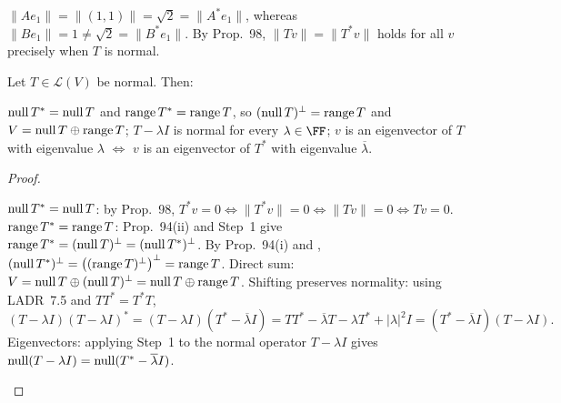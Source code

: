 \documentclass[10pt]{scrartcl}
\newcommand{\LL}{\mathcal L}\newcommand{\PP}{\mathcal P}\newcommand{\MM}{\mathcal M}
\begin{document}
\begin{fig}
\end{fig}

\revisit $\|Ae_1\|=\|(1,1)\|=\sqrt{2}=\|A^*e_1\|$, whereas $\|Be_1\|=1\neq \sqrt{2}=\|B^*e_1\|$. By Prop.~98, $\|Tv\|=\|T^*v\|$ holds for all $v$ precisely when $T$ is normal.

\begin{theorem*}
  Let $T\in\LL(V)$ be normal. Then:
  \begin{enumerate}
    \ii[(a)] $\operatorname{null} T^* = \operatorname{null} T$ and $\operatorname{range} T^* = \operatorname{range} T$, so $(\operatorname{null} T)^\perp = \operatorname{range} T$ and $V = \operatorname{null} T\oplus \operatorname{range} T$;
    \ii[(b)] $T-\lambda I$ is normal for every $\lambda\in\FF$;
    \ii[(c)] $v$ is an eigenvector of $T$ with eigenvalue $\lambda$ $\iff$ $v$ is an eigenvector of $T^*$ with eigenvalue $\overline{\lambda}$.
  \end{enumerate}
\end{theorem*}
\begin{proof}
  \begin{steps}
    \ii $\operatorname{null} T^*=\operatorname{null} T$: by Prop.~98, $T^*v=0 \iff \|T^*v\|=0 \iff \|Tv\|=0 \iff Tv=0$.
    \ii $\operatorname{range} T^*=\operatorname{range} T$: Prop.~94(ii) and Step~1 give $\operatorname{range} T^* = (\operatorname{null} T)^\perp = (\operatorname{null} T^*)^\perp$. By Prop.~94(i) and , $(\operatorname{null} T^*)^\perp = \bigl((\operatorname{range} T)^\perp\bigr)^\perp = \operatorname{range} T$.
    \ii Direct sum: $V = \operatorname{null} T\oplus(\operatorname{null} T)^\perp = \operatorname{null} T\oplus\operatorname{range} T$.
    \ii Shifting preserves normality: using LADR~7.5 and $TT^*=T^*T$,
    \[
      (T-\lambda I)(T-\lambda I)^* = (T-\lambda I)(T^*-\overline{\lambda}I) = TT^*-\overline{\lambda}T-\lambda T^*+|\lambda|^2I = (T^*-\overline{\lambda}I)(T-\lambda I).
    \]
    \ii Eigenvectors: applying Step~1 to the normal operator $T-\lambda I$ gives $\operatorname{null}(T-\lambda I)=\operatorname{null}(T^*-\overline{\lambda}I)$.
  \end{steps}
\end{proof}
\end{document}
